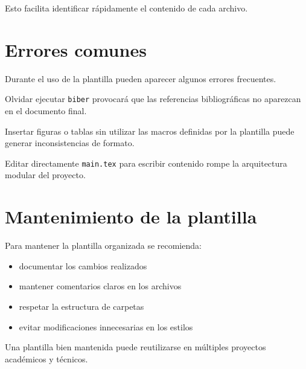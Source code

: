 


Esto facilita identificar rápidamente el
contenido de cada archivo.




\section{Errores comunes}

Durante el uso de la plantilla pueden aparecer
algunos errores frecuentes.



\begin{warningbox}
Olvidar ejecutar \texttt{biber} provocará que
las referencias bibliográficas no aparezcan
en el documento final.
\end{warningbox}



\begin{warningbox}
Insertar figuras o tablas sin utilizar las macros
definidas por la plantilla puede generar
inconsistencias de formato.
\end{warningbox}



\begin{warningbox}
Editar directamente \texttt{main.tex} para escribir
contenido rompe la arquitectura modular del proyecto.
\end{warningbox}




\section{Mantenimiento de la plantilla}

Para mantener la plantilla organizada se recomienda:

\begin{itemize}

\item documentar los cambios realizados
\item mantener comentarios claros en los archivos
\item respetar la estructura de carpetas
\item evitar modificaciones innecesarias en los estilos

\end{itemize}



\begin{examplebox}
Una plantilla bien mantenida puede reutilizarse
en múltiples proyectos académicos y técnicos.
\end{examplebox}
